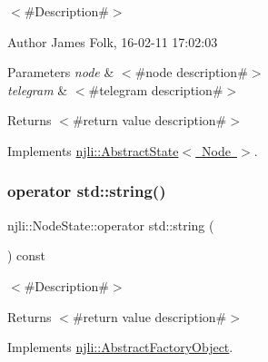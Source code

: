 $<$\#\+Description\#$>$ 

\begin{DoxyAuthor}{Author}
James Folk, 16-\/02-\/11 17\+:02\+:03
\end{DoxyAuthor}

\begin{DoxyParams}{Parameters}
{\em node} & $<$\#node description\#$>$ \\
\hline
{\em telegram} & $<$\#telegram description\#$>$\\
\hline
\end{DoxyParams}
\begin{DoxyReturn}{Returns}
$<$\#return value description\#$>$ 
\end{DoxyReturn}


Implements \mbox{\hyperlink{classnjli_1_1_abstract_state_aa486b2e60e57d789855acdfb555a4cdc}{njli\+::\+Abstract\+State$<$ Node $>$}}.

\mbox{\label{classnjli_1_1_node_state_a9565c2a4a62f9ee0093da373fcbd716a}} 
\subsubsection{\texorpdfstring{operator std\+::string()}{operator std::string()}}
{\footnotesize\ttfamily njli\+::\+Node\+State\+::operator std\+::string (\begin{DoxyParamCaption}{ }\end{DoxyParamCaption}) const\hspace{0.3cm}{\ttfamily [virtual]}}

$<$\#\+Description\#$>$

\begin{DoxyReturn}{Returns}
$<$\#return value description\#$>$ 
\end{DoxyReturn}


Implements \mbox{\hyperlink{classnjli_1_1_abstract_factory_object_a838f4fa7e65cace6098aab5222892942}{njli\+::\+Abstract\+Factory\+Object}}.

\mbox{\label{classnjli_1_1_node_state_a680aec8f08f28157238c1f2d178e99b3}} 
